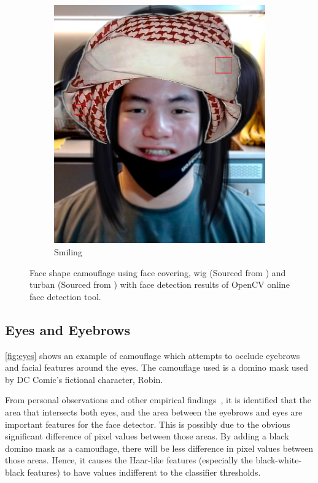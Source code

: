 \documentclass[10pt,twocolumn,letterpaper]{article}
\begin{document}
\begin{figure}[t]
    \hfill
    \begin{subfigure}[b]{.49\linewidth}
        \centering
        \includegraphics[width=\linewidth]{Figures/face_shape_3.png}
        \caption{Smiling}
    \end{subfigure}
    
    
    \caption{Face shape camouflage using face covering, wig (Sourced from \cite{wig}) and turban (Sourced from \cite{turban}) with face detection results of OpenCV online face detection tool.}
    \label{fig:face-shape}
\end{figure}

\subsection{Eyes and Eyebrows} \label{sec:eyes}

\cref{fig:eyes} shows an example of camouflage which attempts to occlude eyebrows and facial features around the eyes. The camouflage used is a domino mask used by DC Comic's fictional character, Robin.

From personal observations and other empirical findings~\cite{cvdazzle}, it is identified that the area that intersects both eyes, and the area between the eyebrows and eyes are important features for the face detector. This is possibly due to the obvious significant difference of pixel values between those areas. By adding a black domino mask as a camouflage, there will be less difference in pixel values between those areas. Hence, it causes the Haar-like features (especially the black-white-black features) to have values indifferent to the classifier thresholds.
\end{document}
